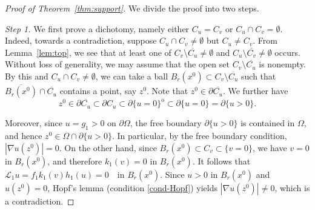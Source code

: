 \documentclass[11pt,oneside,english]{amsart}
\numberwithin{equation}{section}
\theoremstyle{plain}
\numberwithin{equation}{section}
\begin{document}
\begin{proof}[Proof of Theorem~\ref{thm:support}]
We divide the proof into two steps.

\medskip\noindent\emph{Step 1.}
We first prove a dichotomy, namely  either $C_u=C_v$ or $C_u\cap C_v=\emptyset$. Indeed, towards a contradiction, suppose $C_u \cap C_v\neq \emptyset$ but $C_u\neq C_v$. From Lemma~\ref{lem:top}, we see that at least one of $C_v\setminus\overline{C_u}\neq\emptyset$ and $C_u\setminus\overline{C_v}\neq\emptyset$ occurs. Without loss of generality, we may assume that the open set $C_v\setminus\overline{C_u}$ is nonempty. By this and $C_u\cap C_v\neq\emptyset$, we can take a ball $B_r(x^0)\subset C_v\setminus \overline{C_u}$ such that $\overline{B_r(x^0)}\cap\overline{C_u}$ contains a point, say $z^0$. Note that $z^0\in \partial\overline{C_u}$. We further have
$$
z^0\in \partial\overline{C_u}\subset \partial C_u\subset\partial\{u=0\}^{\mathrm{o}}\subset\partial\{u=0\}=\partial\{u>0\}.
$$


Moreover, since $u=g_1>0$ on $\partial\Omega$, the free boundary $\partial\{u>0\}$ is contained in $\Omega$, and hence $z^0\in \Omega\cap\partial\{u>0\}$.
In particular, by the free boundary condition, $|\nabla u(z^0)|=0$. On the other hand, since $B_r(x^0)\subset C_v\subset\{v=0\}$, we have $v=0$ in $B_r(x^0)$,
and therefore $k_1(v)=0$ in $B_r(x^0)$. It follows that $
\mathcal L_1 u = f_1 k_1(v) h_1(u)=0 \quad \text{in } B_r(x^0).$
Since $u>0$ in $B_r(x^0)$ and $u(z^0)=0$, Hopf's lemma (condition \ref{cond-Hopf}) yields $|\nabla u(z^0)|\neq 0$, which is a contradiction.


\end{proof}
\end{document}
